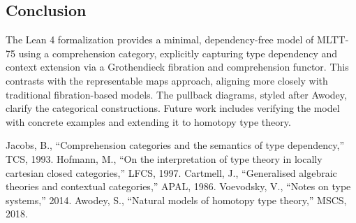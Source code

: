 \documentclass{article}
\begin{document}
\newpage

\subsection{Conclusion}
The Lean 4 formalization provides a minimal, dependency-free model of MLTT-75 using a comprehension category, explicitly capturing type dependency and context extension via a Grothendieck fibration and comprehension functor. This contrasts with the representable maps approach, aligning more closely with traditional fibration-based models. The pullback diagrams, styled after Awodey, clarify the categorical constructions. Future work includes verifying the model with concrete examples and extending it to homotopy type theory.

\begin{thebibliography}{9}
 Jacobs, B., ``Comprehension categories and the semantics of type dependency,'' TCS, 1993.
 Hofmann, M., ``On the interpretation of type theory in locally cartesian closed categories,'' LFCS, 1997.
 Cartmell, J., ``Generalised algebraic theories and contextual categories,'' APAL, 1986.
 Voevodsky, V., ``Notes on type systems,'' 2014.
 Awodey, S., ``Natural models of homotopy type theory,'' MSCS, 2018.
\end{thebibliography}
\end{document}
